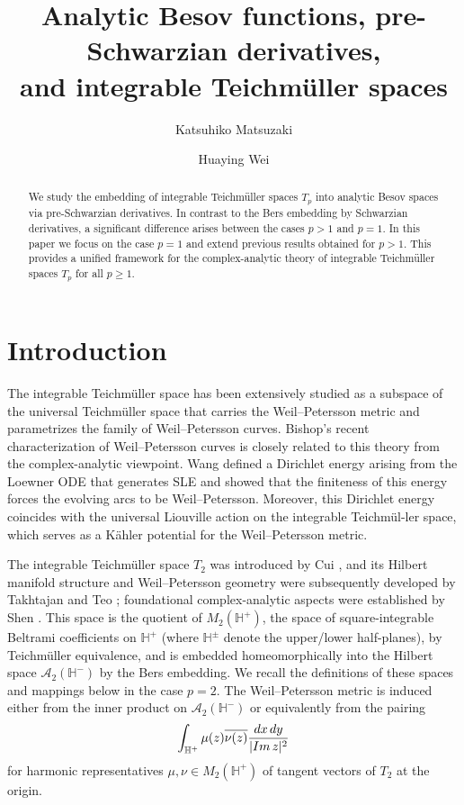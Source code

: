 \documentclass[amstex,12pt,reqno]{amsart}
\title[Integrable Teich\-m\"ul\-ler space]{Analytic Besov functions, pre-Schwarzian derivatives, 
\\and integrable Teich\-m\"ul\-ler spaces}
\author[K. Matsuzaki]{Katsuhiko Matsuzaki}
\author[H. Wei]{Huaying Wei}
\theoremstyle{definition}
\begin{document}
\maketitle

\begin{abstract}
We study the embedding of integrable Teichm\"uller spaces $T_p$ into analytic Besov spaces
via pre-Schwarzian derivatives. In contrast to the Bers embedding by Schwarzian derivatives,
a significant difference arises between the cases $p>1$ and $p=1$. In this paper we focus on the case $p=1$ and
extend previous results obtained for $p>1$. 
This provides a unified framework for the complex-analytic theory of 
integrable Teichm\"uller spaces $T_p$ for all $p \geq 1$.
\end{abstract}


\section{Introduction}\label{1}

The integrable Teich\-m\"ul\-ler space has been extensively studied as a subspace of the universal Teich\-m\"ul\-ler space that carries the Weil--Petersson metric and parametrizes the family of Weil--Petersson curves. Bishop's recent characterization of Weil--Petersson curves \cite{Bi} is closely related to this theory from the complex-analytic viewpoint.
Wang \cite{Wa} defined a Dirichlet energy arising from the Loewner ODE that generates SLE and showed that the finiteness of this energy forces the evolving arcs to be Weil--Petersson. Moreover, this Dirichlet energy coincides with the universal Liouville action on the integrable Teichm\"ul-ler space, which serves as a K\"ahler potential for the Weil--Petersson metric.

The integrable Teich\-m\"ul\-ler space $T_2$ was introduced by Cui \cite{Cu}, and its Hilbert manifold structure and Weil--Petersson geometry were subsequently developed by Takhtajan and Teo \cite{TT}; foundational complex-analytic aspects were established by Shen \cite{Sh}. 
This space is the quotient of $M_2(\mathbb H^+)$, the space of square-integrable
Beltrami coefficients on $\mathbb H^+$ (where $\mathbb H^\pm$ denote the upper/lower half-planes),
by Teichm\"uller equivalence,
and is embedded homeomorphically into the Hilbert space
$\mathcal A_2(\mathbb H^-)$ by the Bers embedding.
We recall the definitions of these spaces and mappings below in the case $p=2$. 
The Weil--Petersson metric is induced either from the inner product on $\mathcal A_2(\mathbb H^-)$ or equivalently from the pairing
$$
\int_{\mathbb H^+}\mu(z) \overline{\nu(z)}\frac{dx\,dy}{|{\rm Im}\, z|^2}
$$
for harmonic representatives $\mu, \nu \in M_2(\mathbb H^+)$ of tangent vectors of $T_2$ at the origin.
\end{document}
